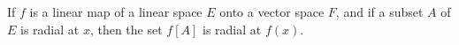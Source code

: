 If $f$ is a linear map of a linear space $E$ onto a vector space $F$, and if a subset $A$ of $E$ is radial at $x$, then the set $f[A]$ is radial at $f(x)$.
